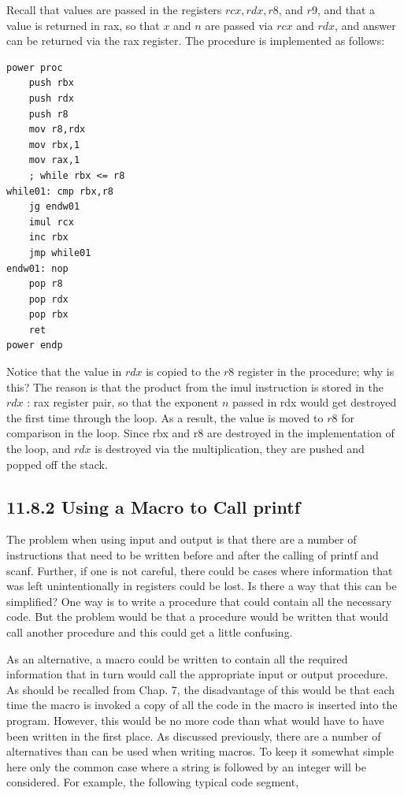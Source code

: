\documentclass[10pt]{book}
\begin{document}
Recall that values are passed in the registers $r c x, r d x, r 8$, and $r 9$, and that a value is returned in rax, so that $x$ and $n$ are passed via $r c x$ and $r d x$, and answer can be returned via the rax register. The procedure is implemented as follows:

\begin{verbatim}
power proc
    push rbx
    push rdx
    push r8
    mov r8,rdx
    mov rbx,1
    mov rax,1
    ; while rbx <= r8
while01: cmp rbx,r8
    jg endw01
    imul rcx
    inc rbx
    jmp while01
endw01: nop
    pop r8
    pop rdx
    pop rbx
    ret
power endp
\end{verbatim}

Notice that the value in $r d x$ is copied to the $r 8$ register in the procedure; why is this? The reason is that the product from the imul instruction is stored in the $r d x$ : rax register pair, so that the exponent $n$ passed in rdx would get destroyed the first time through the loop. As a result, the value is moved to $r 8$ for comparison in the loop. Since rbx and r8 are destroyed in the implementation of the loop, and $r d x$ is destroyed via the multiplication, they are pushed and popped off the stack.

\subsection*{11.8.2 Using a Macro to Call printf}
The problem when using input and output is that there are a number of instructions that need to be written before and after the calling of printf and scanf. Further, if one is not careful, there could be cases where information that was left unintentionally in registers could be lost. Is there a way that this can be simplified? One way is to write a procedure that could contain all the necessary code. But the problem would be that a procedure would be written that would call another procedure and this could get a little confusing.

As an alternative, a macro could be written to contain all the required information that in turn would call the appropriate input or output procedure. As should be recalled from Chap. 7, the disadvantage of this would be that each time the macro is invoked a copy of all the code in the macro is inserted into the program. However, this would be no more code than what would have to have been written in the first place. As discussed previously, there are a number of alternatives than can be used when writing macros. To keep it somewhat simple here only the common case where a string is followed by an integer will be considered. For example, the following typical code segment,
\end{document}
